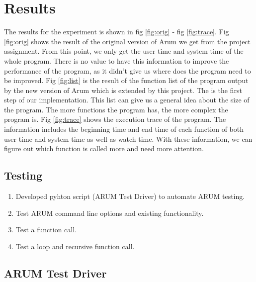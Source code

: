 \documentclass[11pt,letterpaper,oneside]{article}
\begin{document}
\section{Results}
\label{sec:results}

The results for the experiment is shown in fig \ref{fig:orig} - fig \ref{fig:trace}. Fig \ref{fig:orig} shows the result of the original version of Arum we get from the project assignment. From this point, we only get the user time and system time of the whole program. There is no value to have this information to improve the performance of the program, as it didn't give us where does the program need to be improved. Fig \ref{fig:list} is the result of the function list of the program output by the new version of Arum which is extended by this project. The is the first step of our implementation. This list can give us a general idea about the size of the program. The more functions the program has, the more complex the program is. Fig \ref{fig:trace} shows the execution trace of the program. The information includes the beginning time and end time of each function of both user time and system time as well as watch time. With these information, we can figure out which function is called more and need more attention.

\subsection{Testing}

\begin{enumerate}
\item Developed pyhton script (ARUM Test Driver) to automate ARUM testing.
\item Test ARUM command line options and existing functionality.
\item Test a function call.
\item Test a loop and recursive function call.
\end{enumerate}


\subsection{ARUM Test Driver}
\end{document}
